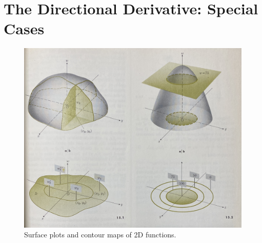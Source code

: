 \documentclass[../main.tex]{subfiles}
\begin{document}
\section{The Directional Derivative: Special Cases}
\begin{figure}[h!]
    \centering
    \includegraphics[width=0.7\linewidth]{ExtFiles/SurfacesAndContours.jpg}
    \caption{Surface plots and contour maps of 2D functions.}
    \label{fig:SurfacesAndContours}
\end{figure}
\end{document}
